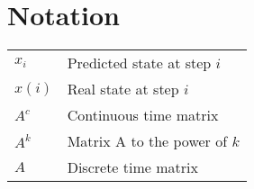 \section{Notation}
\renewcommand{\arraystretch}{1.3}
\setlength{\oldtabcolsep}{\tabcolsep}\setlength\tabcolsep{3pt}

\begin{tabularx}{\linewidth}{@{}lX@{}}
    $x_i$  & Predicted state at step $i$  \\
    $x(i)$ & Real state at step $i$       \\
    $A^c$  & Continuous time matrix       \\
    $A^k$  & Matrix A to the power of $k$ \\ %
    $A$    & Discrete time matrix
\end{tabularx}

\renewcommand{\arraystretch}{1}
\setlength\tabcolsep{\oldtabcolsep}
